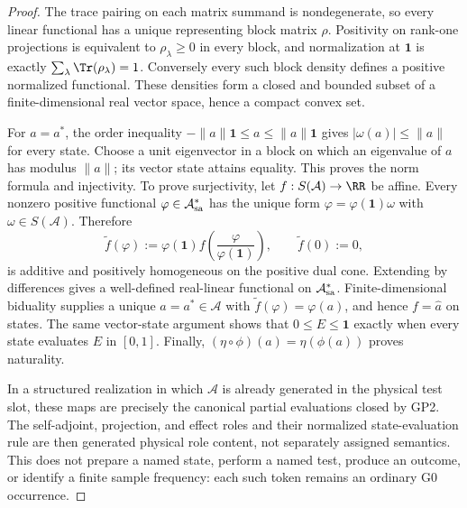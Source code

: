 \documentclass[12pt,a4paper]{article}
\begin{document}
\begin{proof}
The trace pairing on each matrix summand is nondegenerate, so every linear
functional has a unique representing block matrix \(\rho\).  Positivity on
rank-one projections is equivalent to \(\rho_\lambda\ge0\) in every block, and
normalization at \(\mathbf1\) is exactly
\(\sum_\lambda\Tr(\rho_\lambda)=1\).  Conversely every such block density
defines a positive normalized functional.  These densities form a closed and
bounded subset of a finite-dimensional real vector space, hence a compact
convex set.

For \(a=a^*\), the order inequality
\(-\|a\|\mathbf1\le a\le\|a\|\mathbf1\) gives
\(|\omega(a)|\le\|a\|\) for every state.  Choose a unit eigenvector in a
block on which an eigenvalue of \(a\) has modulus \(\|a\|\); its vector state
attains equality.  This proves the norm formula and injectivity.  To prove
surjectivity, let \(f:S(\mathcal A)\to\RR\) be affine.  Every nonzero positive
functional \(\varphi\in\mathcal A_{\rm sa}^*\) has the unique form
\(\varphi=\varphi(\mathbf1)\omega\) with \(\omega\in S(\mathcal A)\).
Therefore
\[
 \widetilde f(\varphi):=\varphi(\mathbf1)
 f\!\left(\frac{\varphi}{\varphi(\mathbf1)}\right),
 \qquad \widetilde f(0):=0,
\]
is additive and positively homogeneous on the positive dual cone.  Extending
by differences gives a well-defined real-linear functional on
\(\mathcal A_{\rm sa}^*\).  Finite-dimensional biduality supplies a unique
\(a=a^*\in\mathcal A\) with \(\widetilde f(\varphi)=\varphi(a)\), and hence
\(f=\widehat a\) on states.  The same vector-state argument shows that
\(0\le E\le\mathbf1\) exactly when every state evaluates \(E\) in
\([0,1]\).  Finally,
\((\eta\circ\phi)(a)=\eta(\phi(a))\) proves naturality.

In a structured realization in which \(\mathcal A\) is already generated in
the physical test slot, these maps are precisely the canonical partial
evaluations closed by GP2.  The self-adjoint, projection, and effect roles and
their normalized state-evaluation rule are then generated physical role
content, not separately assigned semantics.  This does not prepare a named
state, perform a named test, produce an outcome, or identify a finite sample
frequency: each such token remains an ordinary G0 occurrence.
\end{proof}
\end{document}
